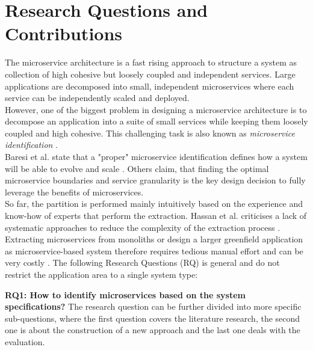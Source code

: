 \section{Research Questions and Contributions}
\label{sec:Introduction:ResearchQuestions}
The microservice architecture is a fast rising approach to structure a system as collection of high cohesive but loosely coupled and independent services. Large applications are decomposed into small, independent microservices where each service can be independently scaled and deployed. 
\\
However, one of the biggest problem in designing a microservice architecture is to decompose an application into a suite of small services while keeping them loosely coupled and high cohesive. This challenging task is also known as \textit{microservice identification} \cite{ObjectAwareAmiri}. \\
Baresi et al. state that a "proper" microservice identification defines how a system will be able to evolve and scale \cite{interfaceAnalysisBaresi}. Others claim, that finding the optimal microservice boundaries \cite{ClassificationOfRefactoring} and service granularity  \cite{ArchitecturalMetaModelling} is the key design decision to fully leverage the benefits of microservices. 
\\
So far, the partition is performed mainly intuitively based on the experience and know-how of experts that perform the extraction. Hassan et al. criticises a lack of systematic approaches to reduce the complexity of the extraction process \cite{ArchitecturalMetaModelling}. Extracting microservices from monoliths or design a larger greenfield application as microservice-based system therefore requires tedious manual effort and can be very costly \cite{FunctionalDecompositionHeinrich} \cite{ExtractionMazlami}. 
The following Research Questions (RQ) is general and do not restrict the application area to a single system type:


\vspace{1cm}
\par
\begingroup
\leftskip=1cm
\rightskip=1cm

\noindent
\textbf{RQ1: How to identify microservices based on the system specifications?}
\vspace{0.5cm}
The research question can be further divided into more specific sub-questions, where the first question covers the literature research, the second one is about the construction of a new approach and the last one deals with the evaluation.

